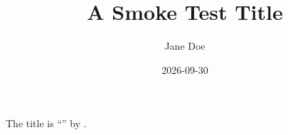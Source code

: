 \documentclass{article}
\title{A Smoke Test Title}
\author{Jane Doe}
\date{2026-09-30}
\begin{document}
\maketitle
The title is ``\thetitle'' by \theauthor.
\end{document}
